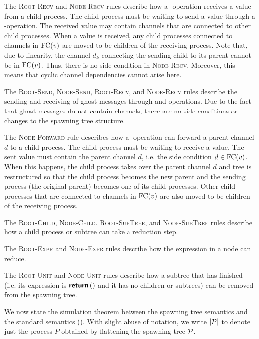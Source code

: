 The \textsc{Root-Recv} and \textsc{Node-Recv} rules describe how a \Recv{}-operation
receives a value from a child process. The child process must be waiting to send a value
through a \Send{}-operation. The received value may contain channels that are connected to
other child processes. When a value is received, any child processes connected to channels
in $\text{FC}({v})$ are moved to be children of the receiving process. Note that, due to linearity,
the channel $d_k$ connecting the sending child to its parent cannot be in $\text{FC}({v})$.
Thus, there is no side condition in \textsc{Node-Recv}. Moreover, this means that
cyclic channel dependencies cannot arise here.

The \textsc{Root-\underline{Send}}, \textsc{Node-\underline{Send}}, \textsc{Root-\underline{Recv}},
and \textsc{Node-\underline{Recv}} rules describe the sending and receiving of 
ghost messages through \SendI{} and \RecvI{} operations. Due to the fact that ghost messages
do not contain channels, there are no side conditions or changes to the spawning tree structure.

The \textsc{Node-Forward} rule describes how a \Send{}-operation can forward a
parent channel $d$ to a child process. The child process must be waiting to
receive a value. The sent value must contain the parent channel $d$, i.e. the
side condition $d \in \text{FC}({v})$. When this happens, the child process takes over
the parent channel $d$ and tree is restructured so that the child process
becomes the new parent and the sending process (the original parent) becomes one
of its child processes. Other child processes that are connected to channels in
$\text{FC}({v})$ are also moved to be children of the receiving process.

The \textsc{Root-Child}, \textsc{Node-Child}, \textsc{Root-SubTree}, and \textsc{Node-SubTree}
rules describe how a child process or subtree can take a reduction step.

The \textsc{Root-Expr} and \textsc{Node-Expr} rules describe how the expression
in a node can reduce.

The \textsc{Root-Unit} and \textsc{Node-Unit} rules describe how a subtree
that has finished (i.e. its expression is $\textbf{\textsf{return}}\,{{()}}$ and it has no children or subtrees)
can be removed from the spawning tree.

We now state the simulation theorem between the spawning tree semantics
and the standard semantics ().
With slight abuse of notation, we write $| \mathcal{P} |$ to denote just the process $P$
obtained by flattening the spawning tree $\mathcal{P}$.

